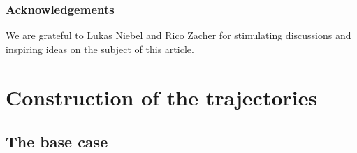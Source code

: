 \documentclass[JEP,XML,SOM,Unicode,NoFloatCountersInSection,published]{cedram}
\theoremstyle{definition}
\begin{document}
\subsubsection*{Acknowledgements}
We are grateful to Lukas Niebel and Rico Zacher for stimulating discussions and inspiring ideas on the subject of this article.

\section{Construction of the trajectories}
\label{sec:trajectories}

\subsection{The base case}
\label{sec:toy-local}
\end{document}
